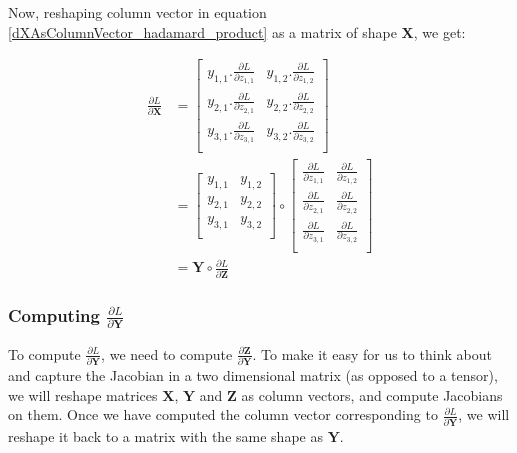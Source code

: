 \documentclass{article}
\newcommand{\matr}[1]{\mathbf{#1}} %
\begin{document}
Now, reshaping column vector in equation \ref{dXAsColumnVector_hadamard_product} as a matrix of shape $\matr{X}$, we get:

\begin{align}
\frac{\partial L}{\partial \matr{X}} &=
\begin{bmatrix}
y_{1,1}.\frac{\partial L}{\partial z_{1,1}} &
y_{1,2}.\frac{\partial L}{\partial z_{1,2}} \\[0.7em]
y_{2,1}.\frac{\partial L}{\partial z_{2,1}} &
y_{2,2}.\frac{\partial L}{\partial z_{2,2}} \\[0.7em]
y_{3,1}.\frac{\partial L}{\partial z_{3,1}} &
y_{3,2}.\frac{\partial L}{\partial z_{3,2}} \\[0.7em]
\end{bmatrix}
\nonumber \\
&=
\begin{bmatrix}
y_{1,1} & y_{1,2} \\%
y_{2,1} & y_{2,2} \\%
y_{3,1} & y_{3,2} \\%
\end{bmatrix}
\circ
\begin{bmatrix}
\frac{\partial L}{\partial z_{1,1}} & \frac{\partial L}{\partial z_{1,2}} \\[0.5em]
\frac{\partial L}{\partial z_{2,1}} & \frac{\partial L}{\partial z_{2,2}} \\[0.5em]
\frac{\partial L}{\partial z_{3,1}} & \frac{\partial L}{\partial z_{3,2}} \\[0.5em]
\end{bmatrix}
\nonumber \\
&=
\matr{Y} \circ \frac{\partial L}{\partial \matr{Z}}
\end{align}

\subsubsection{Computing $\frac{\partial L}{\partial \matr{Y}}$}
To compute $\frac{\partial L}{\partial \matr{Y}}$, we need to compute $\frac{\partial \matr{Z}}{\partial \matr{Y}}$. To make it easy for us to think about and capture the Jacobian in a two dimensional matrix (as opposed to a tensor), we will reshape matrices $\matr{X}$, $\matr{Y}$ and $\matr{Z}$ as column vectors, and compute Jacobians on them. Once we have computed the column vector corresponding to $\frac{\partial L}{\partial \matr{Y}}$, we will reshape it back to a matrix with the same shape as $\matr{Y}$.
\end{document}
